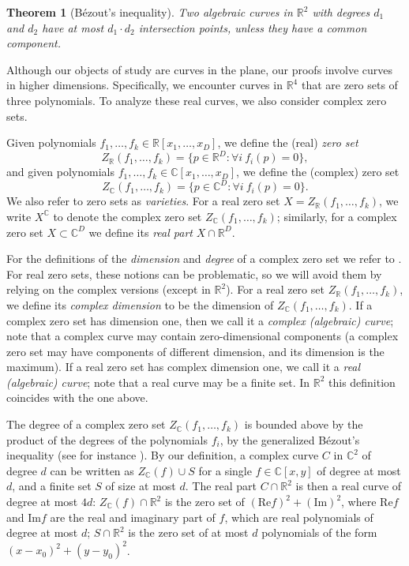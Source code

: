 \documentclass[12pt]{article}
\newtheorem{theorem}{Theorem}[section]
\newcommand{\RR}{\mathbb R}
\newcommand{\CC}{\mathbb C}
\begin{document}
\begin{theorem}[B\'ezout's inequality]\label{thm:bezout}
 Two algebraic curves in $\RR^2$ with degrees $d_1$ and $d_2$ have at most $d_1\cdot d_2$ intersection points, unless they have a common component.
\end{theorem}

Although our objects of study are curves in the plane, our proofs involve curves in higher dimensions. Specifically, we encounter curves in $\RR^4$ that are zero sets of three polynomials. To analyze these real curves, we also consider complex zero sets.

Given polynomials $f_1,\ldots,f_k\in\RR[x_1,\dots,x_D]$, we define the (real) \emph{zero set}
\[Z_{\RR}(f_1,\ldots,f_k) = \{p\in\RR^D: \forall i ~f_i(p) = 0\},\]
and given polynomials $f_1,\ldots,f_k\in\CC[x_1,\dots,x_D]$, we define the (complex) zero set
\[Z_{\CC}(f_1,\ldots,f_k) = \{p\in\CC^D: \forall i ~f_i(p) = 0\}.\]
We also refer to zero sets as \emph{varieties}.
For a real zero set $X=Z_{\RR}(f_1,\ldots,f_k)$, we write $X^\CC$ to denote the complex zero set $Z_{\CC}(f_1,\ldots,f_k)$; similarly, for a complex zero set $X\subset \CC^D$ we define its \emph{real part} $X\cap \RR^D$.



For the definitions of the {\it dimension} and \emph{degree} of a complex zero set we refer to \cite{harris:algebraic}.
For real zero sets, these notions can be problematic, so we will avoid them by relying on the complex versions (except in $\RR^2$).
For a real zero set $Z_{\RR}(f_1,\ldots,f_k)$, we define its {\it complex dimension} to be the dimension of $Z_{\CC}(f_1,\ldots,f_k)$.
If a complex zero set has dimension one, then we call it a {\it complex (algebraic) curve}; note that a complex curve may contain zero-dimensional components (a complex zero set may have components of different dimension, and its dimension is the maximum).
If a real zero set has complex dimension one, we call it a {\it real (algebraic) curve}; note that a real curve may be a finite set.
In $\RR^2$ this definition coincides with the one above.

The degree of a complex zero set $Z_\CC(f_1,\ldots,f_k)$ is bounded above by the product of the degrees of the polynomials $f_i$, by the generalized B\'ezout's inequality (see for instance \cite{heintz:definability}).
By our definition, a complex curve $C$ in $\CC^2$ of degree $d$ can be written as $Z_\CC(f)\cup S$ for a single $f\in \CC[x,y]$ of degree at most $d$, and a finite set $S$ of size at most $d$.
The real part $C\cap \RR^2$ is then a real curve of degree at most $4d$:  $Z_\CC(f)\cap \RR^2$ is the zero set of $(\mathrm{Re}f)^2+(\mathrm{Im})^2$, where $\mathrm{Re}f$ and $\mathrm{Im}f$ are the real and imaginary part of $f$, which are real polynomials of degree at most $d$; $S\cap \RR^2$ is the zero set of at most $d$ polynomials of the form $(x-x_0)^2+(y-y_0)^2$.
\end{document}
